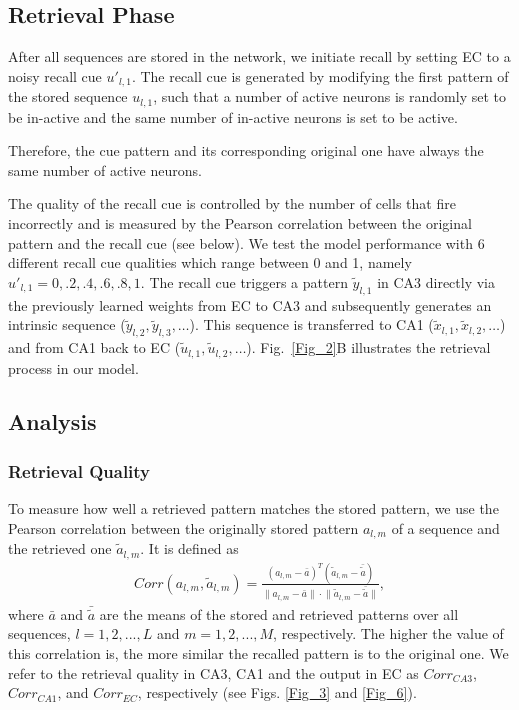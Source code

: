 \documentclass[utf8]{frontiersSCNS} %
\begin{document}
\subsection{Retrieval Phase}
\label{S:4}


After all sequences are stored in the network, we initiate recall by setting EC to a noisy recall cue $u'_{l, 1}$.  The recall cue is generated by modifying the first pattern of the stored sequence $u_{l, 1}$, such that a number of active neurons is randomly set to be in-active and the same number of in-active neurons is set to be active. 

Therefore, the cue pattern and its corresponding original one have always the same number of active neurons. 

The quality of the recall cue is controlled by the number of cells that fire incorrectly and is measured by the Pearson correlation between the original pattern and the recall cue (see below). We test the model performance with $6$ different recall cue qualities which range between 0 and 1, namely $u'_{l, 1} = 0, .2, .4, .6, .8, 1$.       
%
The recall cue triggers a pattern $\tilde{y}_{l, 1}$ in CA3 directly via the previously learned weights from EC to CA3 and subsequently generates an intrinsic sequence ($\tilde{y}_{l, 2}, \tilde{y}_{l, 3}, \ldots$). This sequence is transferred to CA1 ($\tilde{x}_{l, 1}, \tilde{x}_{l, 2}, \ldots$) and from CA1 back to EC ($\tilde{u}_{l, 1}, \tilde{u}_{l, 2}, \ldots$). Fig.~\ref{Fig_2}B illustrates the retrieval process in our model. 


\subsection{Analysis}

\subsubsection{Retrieval Quality}
To measure how well a retrieved pattern matches the stored pattern, we use the Pearson correlation between the originally stored pattern $a_{l, m}$ of a sequence  and the retrieved one $\tilde{a}_{l, m}$. It is defined as
\begin{align*}
	Corr(a_{l, m},\tilde{a}_{l, m})  = \frac{(a_{l, m} -\bar{a})^T(\tilde{a}_{l, m} -\bar{\tilde{a}})}
{\lVert{a_{l, m} -\bar{a}} \rVert \cdot \lVert{\tilde{a}_{l, m} -\bar{\tilde{a}}}\rVert },
\end{align*}     
where $\bar{a}$ and $\bar{\tilde{a}}$ are the means of the stored and retrieved patterns over all sequences, $l = 1,2, ..., L$ and $m = 1,2, ..., M$, respectively. The higher the value of this correlation is, the more similar the recalled pattern is to the original one. We refer to the retrieval quality in CA3, CA1 and the output in EC as $Corr_{CA3}$, $Corr_{CA1}$, and $Corr_{EC}$, respectively (see Figs. \ref{Fig_3} and \ref{Fig_6}).
\end{document}

